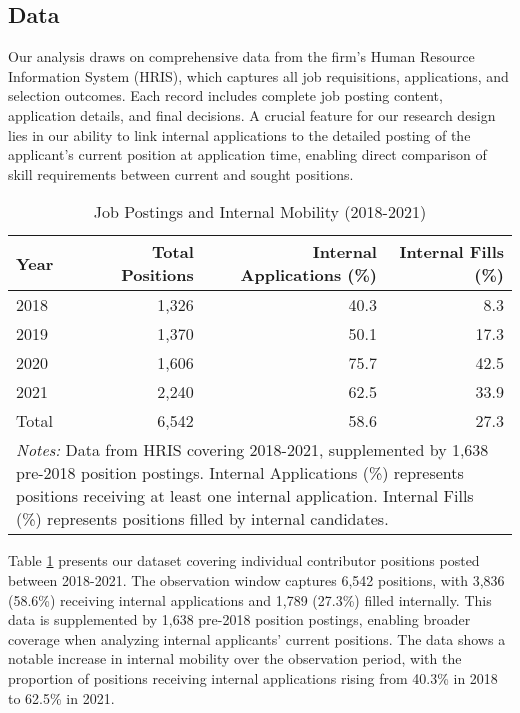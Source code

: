 \subsection{Data}

Our analysis draws on comprehensive data from the firm's Human Resource Information System (HRIS), which captures all job requisitions, applications, and selection outcomes. Each record includes complete job posting content, application details, and final decisions. A crucial feature for our research design lies in our ability to link internal applications to the detailed posting of the applicant's current position at application time, enabling direct comparison of skill requirements between current and sought positions.

\begin{table}[t]
    \caption{Job Postings and Internal Mobility (2018-2021)}
    \begin{tabular*}{\textwidth}{@{\extracolsep\fill}lrrr}
    \toprule
    Year & Total Positions & Internal Applications (\%) & Internal Fills (\%) \\
    \midrule
    2018 & 1,326 & 40.3 & 8.3 \\
    2019 & 1,370 & 50.1 & 17.3 \\
    2020 & 1,606 & 75.7 & 42.5 \\
    2021 & 2,240 & 62.5 & 33.9 \\
    \midrule
    Total & 6,542 & 58.6 & 27.3 \\
    \bottomrule
    \multicolumn{4}{p{\textwidth}}{\footnotesize \textit{Notes:} Data from HRIS covering 2018-2021, supplemented by 1,638 pre-2018 position postings. Internal Applications (\%) represents positions receiving at least one internal application. Internal Fills (\%) represents positions filled by internal candidates.} \\
    \end{tabular*}
    \label{tab:summary}
\end{table}

Table \ref{tab:summary} presents our dataset covering individual contributor positions posted between 2018-2021. The observation window captures 6,542 positions, with 3,836 (58.6\%) receiving internal applications and 1,789 (27.3\%) filled internally. This data is supplemented by 1,638 pre-2018 position postings, enabling broader coverage when analyzing internal applicants' current positions. The data shows a notable increase in internal mobility over the observation period, with the proportion of positions receiving internal applications rising from 40.3\% in 2018 to 62.5\% in 2021.

